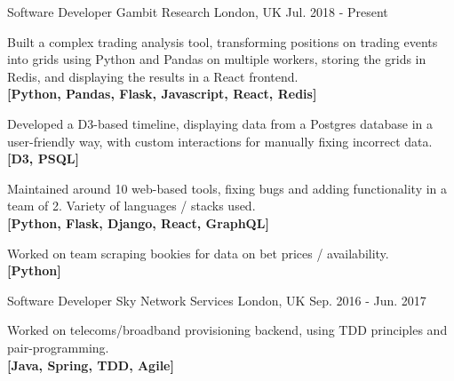 

\begin{cventries}

  \cventry
    {Software Developer} %
    {Gambit Research} %
    {London, UK} %
    {Jul. 2018 - Present} %
    {
      \begin{cvitems} %
          \item {Built a complex trading analysis tool, transforming positions on trading events into grids using Python and Pandas on multiple workers, storing the grids in Redis, and displaying the results in a React frontend.\\\textbf{[Python, Pandas, Flask, Javascript, React, Redis]}}
          \item{Developed a D3-based timeline, displaying data from a Postgres database in a user-friendly way, with custom interactions for manually fixing incorrect data.\\\textbf{[D3, PSQL]}}
          \item {Maintained around 10 web-based tools, fixing bugs and adding functionality in a team of 2. Variety of languages / stacks used.\\\textbf{[Python, Flask, Django, React, GraphQL]}}
          \item {Worked on team scraping bookies for data on bet prices / availability.\\\textbf{[Python]}}
      \end{cvitems}
    }


  \cventry
  {Software Developer} %
    {Sky Network Services} %
    {London, UK} %
    {Sep. 2016 - Jun. 2017} %
    {
      \begin{cvitems} %
      \item {Worked on telecoms/broadband provisioning backend, using TDD principles and pair-programming.\\\textbf{[Java, Spring, TDD, Agile]}}
      \end{cvitems}
    }


\end{cventries}
